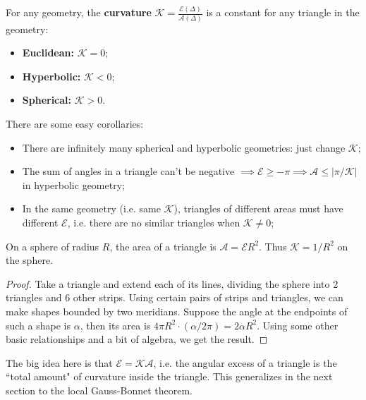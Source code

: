 \documentclass[twoside,10pt]{report}
\begin{document}
\begin{thrm}[]
	\label{constant-curvature}
	For any geometry, the \textbf{curvature} $\mathcal{K} = \frac{\mathcal{E}(\Delta)}{\mathcal{A}(\Delta)} $ is a constant for any triangle in the geometry:
\begin{itemize}
	\item \textbf{Euclidean:} $\mathcal{K} = 0$;
	\item \textbf{Hyperbolic:} $\mathcal{K} < 0$;
	\item \textbf{Spherical:} $\mathcal{K} > 0$.
\end{itemize}
\end{thrm}
There are some easy corollaries:
\begin{itemize}
	\item There are infinitely many spherical and hyperbolic geometries: just change $\mathcal{K}$;
	\item The sum of angles in a triangle can't be negative $\implies \mathcal{E} \geq -\pi \implies \mathcal{A} \leq |\pi / \mathcal{K}|$ in hyperbolic geometry;
	\item In the same geometry (i.e. same $\mathcal{K}$), triangles of different areas must have different $\mathcal{E}$, i.e. there are no similar triangles when $\mathcal{K} \neq 0$;
\end{itemize}


\begin{prop}
	\label{GB-sphere}
On a sphere of radius $R$, the area of a triangle is $\mathcal{A} = \mathcal{E} R^2$. Thus $\mathcal{K} = 1/R^2$ on the sphere.
\end{prop}
\begin{proof}
	Take a triangle and extend each of its lines, dividing the sphere into 2 triangles and 6 other strips. Using certain pairs of strips and triangles, we can make shapes bounded by two meridians. Suppose the angle at the endpoints of such a shape is $\alpha$, then its area is $4\pi R^2 \cdot (\alpha / 2\pi) = 2 \alpha R^2$. Using some other basic relationships and a bit of algebra, we get the result.
\end{proof}

\begin{note}[]
The big idea here is that $\mathcal{E} = \mathcal{K} \mathcal{A}$, i.e. the angular excess of a triangle is the ``total amount" of curvature inside the triangle. This generalizes in the next section to the local Gauss-Bonnet theorem.
\end{note}

\end{document}
